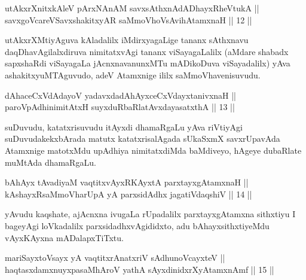 
\begin{shl}
utAkxrXnitxkAleV pArxNAnAM savxsAthxnAdADhayxRheVtukA || \\
savxgoVcareVSavxshakitxyAR saMmoVhoV\s sAvihA\s \s tamxnaH \hfill || 12 ||
  
\end{shl}

\begin{artha}
utAkxrXMtiyAguva kAladalilx iMdirxyagaLige tananx sAthxnavu
daqDhavAgilalxdiruva nimitatxvAgi tananx viSayagaLalilx (aMdare
shabadx sapxshaRdi viSayagaLa jAcnxnavanunxMTu mADikoDuva
viSayadalilx) yAva ashakitxyuMTAguvudo, adeV Atamxnige ililx
saMmoVhavenisuvudu.
\end{artha}


\begin{shl}
dAhaceCxVdAdayoV yadavxdadAhAyxceCxVdayxtanivxnaH || \\
paroVpAdhinimitAtxH suyxduRbaRlatAvxdayasatxthA \hfill || 13 ||
  
\end{shl}

\begin{artha}
suDuvudu, katatxrisuvudu itAyxdi dhamaRgaLu yAva riVtiyAgi
suDuvudakekxbArada matutx katatxrisalAgada sUkaSxmX savxrUpavAda
Atamxnige matotxMdu upAdhiya nimitatxdiMda baMdiveyo, hAgeye dubaRlate
muMtAda dhamaRgaLu.
\end{artha}


\begin{shl}
bAhAyx tAvadiyaM vaqtitxvAyxRKAyxtA parxtayxgAtamxnaH || \\
kAshayxRsaMmoVharUpA yA parxsidAdhx jagatiVdaqshiV \hfill || 14 ||
  
\end{shl}

\begin{artha}
yAvudu kaqshate, ajAcnxna ivugaLa rUpadalilx parxtayxgAtamxna
sithxtiyu I bageyAgi loVkadalilx parxsidadhxvAgididxto, adu
bAhayxsithxtiyeMdu vAyxKAyxna mADalapxTiTxtu.
\end{artha}


\begin{shl}
mariSayxtoV\s sayx yA vaqtitxrAnatxriV sA\s dhunoVcayxteV ||  \\
haqtasxdamxnuyxpasaMhAroV yathA sAyxdinidxrXyAtamxnAmf \hfill || 15 ||
  
\end{shl}

